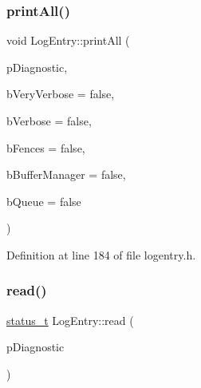 \subsubsection{\texorpdfstring{print\+All()}{printAll()}}
{\footnotesize\ttfamily void Log\+Entry\+::print\+All (\begin{DoxyParamCaption}\item[{sp$<$ \mbox{\hyperlink{classhwcomposer_1_1IDiagnostic}{I\+Diagnostic}} $>$}]{p\+Diagnostic,  }\item[{bool}]{b\+Very\+Verbose = {\ttfamily false},  }\item[{bool}]{b\+Verbose = {\ttfamily false},  }\item[{bool}]{b\+Fences = {\ttfamily false},  }\item[{bool}]{b\+Buffer\+Manager = {\ttfamily false},  }\item[{bool}]{b\+Queue = {\ttfamily false} }\end{DoxyParamCaption})\hspace{0.3cm}{\ttfamily [static]}}



Definition at line 184 of file logentry.\+h.


\begin{DoxyCode}{0}
\end{DoxyCode}
\mbox{\label{classLogEntry_a1c92a359f9d4e3635ae3c2f228ff6206}} 
\subsubsection{\texorpdfstring{read()}{read()}}
{\footnotesize\ttfamily \mbox{\hyperlink{hwcserviceapi_8h_a3806fb2027d9a316d8ca8d9b8b8eb96f}{status\+\_\+t}} Log\+Entry\+::read (\begin{DoxyParamCaption}\item[{sp$<$ \mbox{\hyperlink{classhwcomposer_1_1IDiagnostic}{I\+Diagnostic}} $>$}]{p\+Diagnostic }\end{DoxyParamCaption})}



